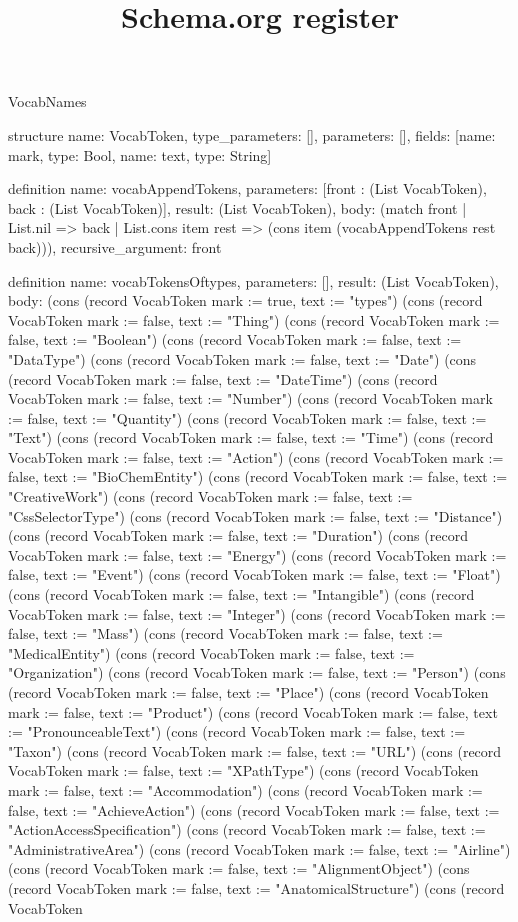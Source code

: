 \begin{lexlean}{VocabNames}
\title{Schema.org register}
\begin{semanticmodule}
structure{
  name: VocabToken,
  type_parameters: [],
  parameters: [],
  fields: [{name: mark, type: Bool}, {name: text, type: String}]
}

definition{
  name: vocabAppendTokens,
  parameters: [front : (List VocabToken), back : (List VocabToken)],
  result: (List VocabToken),
  body: (match front
    | List.nil => back
    | List.cons item rest => (cons item (vocabAppendTokens rest back))),
  recursive_argument: front
}

definition{
  name: vocabTokensOftypes,
  parameters: [],
  result: (List VocabToken),
  body: (cons (record VocabToken {mark := true, text := "types"}) (cons (record VocabToken {mark := false, text := "Thing"}) (cons (record VocabToken {mark := false, text := "Boolean"}) (cons (record VocabToken {mark := false, text := "DataType"}) (cons (record VocabToken {mark := false, text := "Date"}) (cons (record VocabToken {mark := false, text := "DateTime"}) (cons (record VocabToken {mark := false, text := "Number"}) (cons (record VocabToken {mark := false, text := "Quantity"}) (cons (record VocabToken {mark := false, text := "Text"}) (cons (record VocabToken {mark := false, text := "Time"}) (cons (record VocabToken {mark := false, text := "Action"}) (cons (record VocabToken {mark := false, text := "BioChemEntity"}) (cons (record VocabToken {mark := false, text := "CreativeWork"}) (cons (record VocabToken {mark := false, text := "CssSelectorType"}) (cons (record VocabToken {mark := false, text := "Distance"}) (cons (record VocabToken {mark := false, text := "Duration"}) (cons (record VocabToken {mark := false, text := "Energy"}) (cons (record VocabToken {mark := false, text := "Event"}) (cons (record VocabToken {mark := false, text := "Float"}) (cons (record VocabToken {mark := false, text := "Intangible"}) (cons (record VocabToken {mark := false, text := "Integer"}) (cons (record VocabToken {mark := false, text := "Mass"}) (cons (record VocabToken {mark := false, text := "MedicalEntity"}) (cons (record VocabToken {mark := false, text := "Organization"}) (cons (record VocabToken {mark := false, text := "Person"}) (cons (record VocabToken {mark := false, text := "Place"}) (cons (record VocabToken {mark := false, text := "Product"}) (cons (record VocabToken {mark := false, text := "PronounceableText"}) (cons (record VocabToken {mark := false, text := "Taxon"}) (cons (record VocabToken {mark := false, text := "URL"}) (cons (record VocabToken {mark := false, text := "XPathType"}) (cons (record VocabToken {mark := false, text := "Accommodation"}) (cons (record VocabToken {mark := false, text := "AchieveAction"}) (cons (record VocabToken {mark := false, text := "ActionAccessSpecification"}) (cons (record VocabToken {mark := false, text := "AdministrativeArea"}) (cons (record VocabToken {mark := false, text := "Airline"}) (cons (record VocabToken {mark := false, text := "AlignmentObject"}) (cons (record VocabToken {mark := false, text := "AnatomicalStructure"}) (cons (record VocabToken }
\end{semanticmodule}
\end{lexlean}
